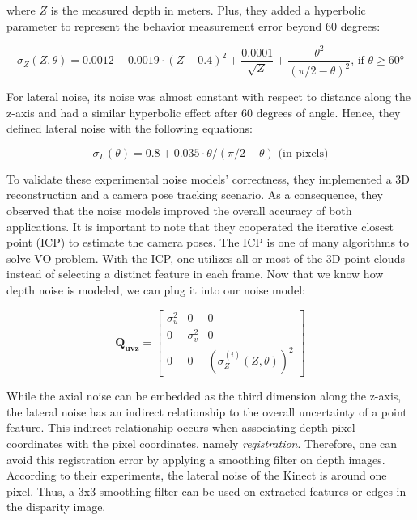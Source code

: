 \documentclass[a4paper]{report}
\numberwithin{figure}{section}
\begin{document}
where $Z$ is the measured depth in meters.  Plus, they added a hyperbolic
parameter to represent the behavior measurement error beyond 60 degrees:

\begin{equation} \sigma_Z (Z,\theta) = 0.0012 + 0.0019 \cdot (Z-0.4)^2 +
\frac{0.0001}{\sqrt{Z}} + \frac{\theta^2}{(\pi/2 - \theta)^2} \text{, if }
\theta \geq \ang{60} \end{equation} \label{eq:axial_noise_w_hyperbolic}

For lateral noise, its noise was almost constant with respect to distance along
the z-axis and had a similar hyperbolic effect after 60 degrees of angle.
Hence, they defined lateral noise with the following equations:

\begin{equation} \sigma_L(\theta) = 0.8 + 0.035 \cdot \theta/(\pi/2-\theta)
\text{ (in pixels)} \end{equation}

To validate these experimental noise models' correctness, they implemented a 3D
reconstruction and a camera pose tracking scenario.  As a consequence, they
observed that the noise models improved the overall accuracy of both
applications. It is important to note that they cooperated the iterative
closest point (ICP) to estimate the camera poses. The ICP is one of many
algorithms to solve VO problem.  With the ICP, one utilizes all or most of the
3D point clouds instead of selecting a distinct feature in each frame. Now that
we know how depth noise is modeled, we can plug it into our noise model:

\begin{equation} \mathbf{Q_{uvz}} = \begin{bmatrix} \sigma_u^2 & 0 & 0 \\ 0 &
\sigma_v^2 & 0 \\ 0 & 0 & (\sigma_Z^{(i)}(Z, \theta))^2 \end{bmatrix}
\end{equation}

While the axial noise can be embedded as the third dimension along the z-axis,
the lateral noise has an indirect relationship to the overall uncertainty of a
point feature. This indirect relationship occurs when associating depth pixel
coordinates with the pixel coordinates, namely \textit{registration}.
Therefore, one can avoid this registration error by applying a smoothing filter
on depth images.  According to their experiments, the lateral noise of the
Kinect is around one pixel.  Thus, a 3x3 smoothing filter can be used on
extracted features or edges in the disparity image.
\end{document}
